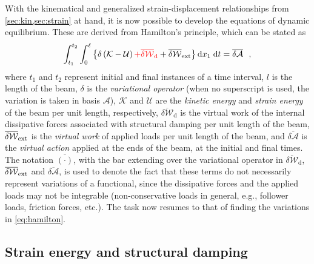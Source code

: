 \documentclass[12pt,a4paper,oneside,english]{abntex2} %
\newcommand{\fix}[1]{{\color{red}#1}}
\def\lp{\left(}
\def\rp{\right)}
\def\A{\mathcal{A}}
\def\xo{x_1}
\def\intt{\int_{t_1}^{t_2}}
\def\intl{\int_{0}^{\ell}}
\def\d{\textnormal{d}}
\def\deltaWd{\overline{\delta\mathcal{W}}_{\text{d}}}
\begin{document}
With the kinematical and generalized strain-displacement relationships from \cref{sec:kin,sec:strain} at hand, it is now possible to develop the equations of dynamic equilibrium. These are derived from Hamilton's principle, which can be stated as
\begin{equation}
    \intt\intl \left\{\delta\lp\mathcal{K}-\mathcal{U}\rp\fix{+\deltaWd}+\overline{\delta \mathcal{W}}_{\textnormal{ext}}\right\} \d \xo\;\d t = \overline{\delta\A} \ \ ,
    \label{eq:hamilton}
\end{equation}
where $t_1$ and $t_2$ represent initial and final instances of a time interval, $l$ is the length of the beam, $\delta$ is the \textit{variational operator} (when no superscript is used, the variation is taken in basis $\A$), $\mathcal{K}$ and $\mathcal{U}$ are the \textit{kinetic energy} and \textit{strain energy} of the beam per unit length, respectively, \fix{$\deltaWd$ is the virtual work of the internal dissipative forces associated with structural damping per unit length of the beam,} $\overline{\delta \mathcal{W}}_{\textnormal{ext}}$ is the \textit{virtual work} of applied loads per unit length of the beam, and $\overline{\delta\A}$ is the \textit{virtual action} applied at the ends of the beam, at the initial and final times. The notation $\overline{(\cdot)}$, with the bar extending over the variational operator in \fix{$\deltaWd$,} $\overline{\delta \mathcal{W}}_{\textnormal{ext}}$ and $\overline{\delta\A}$, is used to denote the fact that these terms do not necessarily represent variations of a functional, since the \fix{dissipative forces and the} applied loads may not be integrable (non-conservative loads in general, e.g., follower loads, friction forces, etc.). The task now resumes to that of finding the variations in \cref{eq:hamilton}.

\subsection{\texorpdfstring{Strain energy \fix{and structural damping}}{Strain energy and structural damping}}
\end{document}
